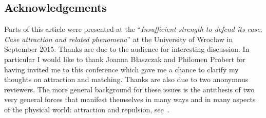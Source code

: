 \documentclass[output=paper]{langsci/langscibook}
\begin{document}
\begin{refcontext}
\section*{Acknowledgements}
Parts of this article were presented at the
    \enquote{\emph{Insufficient strength to defend its case}: \emph{Case
    attraction and related phenomena}} at the University of Wrocław in
    September 2015. Thanks are due to the audience for interesting discussion.
    In particular I would like to thank  Joanna Błaszczak and Philomen Probert
    for having invited me to this conference which gave me a chance to clarify
    my thoughts on attraction and matching. Thanks are also due to two
    anonymous reviewers.  The more general background for these issues is the
    antithesis of two very general forces that manifest themselves in many ways
    and in many aspects of the physical world: attraction and repulsion,
    see~\textcite{VanRiemsdijk2019}.

{\sloppy
\printbibliography[heading=subbibliography,notkeyword=this]
}

\end{refcontext}
\end{document}

